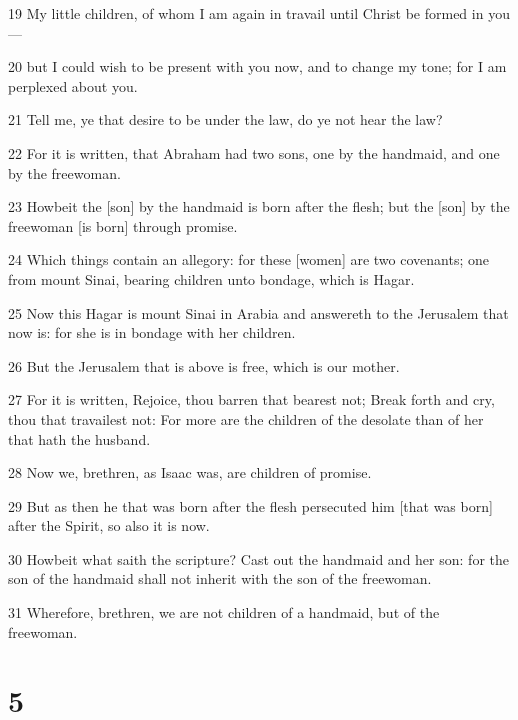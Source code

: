 \par 19 My little children, of whom I am again in travail until Christ be formed in you—
\par 20 but I could wish to be present with you now, and to change my tone; for I am perplexed about you.
\par 21 Tell me, ye that desire to be under the law, do ye not hear the law?
\par 22 For it is written, that Abraham had two sons, one by the handmaid, and one by the freewoman.
\par 23 Howbeit the [son] by the handmaid is born after the flesh; but the [son] by the freewoman [is born] through promise.
\par 24 Which things contain an allegory: for these [women] are two covenants; one from mount Sinai, bearing children unto bondage, which is Hagar.
\par 25 Now this Hagar is mount Sinai in Arabia and answereth to the Jerusalem that now is: for she is in bondage with her children.
\par 26 But the Jerusalem that is above is free, which is our mother.
\par 27 For it is written, Rejoice, thou barren that bearest not; Break forth and cry, thou that travailest not: For more are the children of the desolate than of her that hath the husband.
\par 28 Now we, brethren, as Isaac was, are children of promise.
\par 29 But as then he that was born after the flesh persecuted him [that was born] after the Spirit, so also it is now.
\par 30 Howbeit what saith the scripture? Cast out the handmaid and her son: for the son of the handmaid shall not inherit with the son of the freewoman.
\par 31 Wherefore, brethren, we are not children of a handmaid, but of the freewoman.

\chapter{5}


